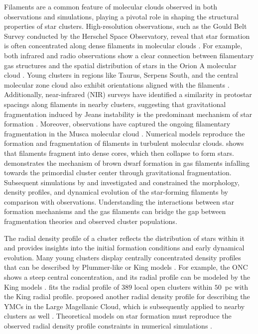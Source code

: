 \documentclass[12pt]{ucsddissertation}
\begin{document}
\begin{CJK*}{UTF8}{gbsn}
Filaments are a common feature of molecular clouds observed in both observations and simulations, playing a pivotal role in shaping the structural properties of star clusters. High-resolution observations, such as the Gould Belt Survey conducted by the Herschel Space Observatory, reveal that star formation is often concentrated along dense filaments in molecular clouds \citep[][]{Andre-2010, Andre-2014}. For example, both infrared and radio observations show a clear connection between filamentary gas structures and the spatial distribution of stars in the Orion A molecular cloud \citep[e.g.,][]{Hacar-2017, Kong-2018}. Young clusters in regions like Taurus, Serpens South, and the central molecular zone cloud also exhibit orientations aligned with the filaments \citep[e.g.,][]{Fernandez-Lopez-2014, Federrath-2016, Palmeirim-2018, Pillai-2020}. Additionally, near-infrared (NIR) surveys have identified a similarity in protostar spacings along filaments in nearby clusters, suggesting that gravitational fragmentation induced by Jeans instability is the predominant mechanism of star formation \citep[][]{Gutermuth-2009}. Moreover, observations have captured the ongoing filamentary fragmentation in the Musca molecular cloud \citep[][]{Kainulainen-2016}. Numerical models reproduce the formation and fragmentation of filaments in turbulent molecular clouds. \citet{Inutsuka-1997} shows that filaments fragment into dense cores, which then collapse to form stars. \citet{Bonnell-2008} demonstrates the mechanism of brown dwarf formation in gas filaments infalling towards the primordial cluster center through gravitational fragmentation. Subsequent simulations by \citet{Smith-2014} and \citet{Trevino-Morales-2019} investigated and constrained the morphology, density profiles, and dynamical evolution of the star-forming filaments by comparison with observations. Understanding the interactions between star formation mechanisms and the gas filaments can bridge the gap between fragmentation theories and observed cluster populations.

The radial density profile of a cluster reflects the distribution of stars within it and provides insights into the initial formation conditions and early dynamical evolution. Many young clusters display centrally concentrated density profiles that can be described by Plummer-like or King models \citep[][]{Plummer-1911, King-1962, King-1966}. For example, the ONC shows a steep central concentration, and its radial profile can be modeled by the King models \citep[][]{Hillenbrand-1998}. \citet{Tarricq-2022} fits the radial profile of $389$ local open clusters within $50$~pc with the King radial profile. \citet{Elson-1987} proposed another radial density profile for describing the YMCs in the Large Magellanic Cloud, which is subsequently applied to nearby clusters as well \citep[e.g.,][]{Hosek-2015, Rui-2019}. Theoretical models on star formation must reproduce the observed radial density profile constraints in numerical simulations \citep[e.g.,][]{Kroupa-2001a}.


\end{CJK*}
\end{document}
